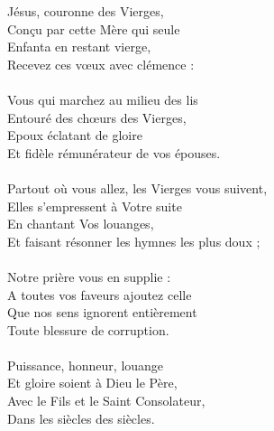 Jésus, couronne des Vierges,\\
Conçu par cette Mère qui seule\\
Enfanta en restant vierge,\\
Recevez ces vœux avec clémence :\\
\\
Vous qui marchez au milieu des lis\\
Entouré des chœurs des Vierges,\\
Epoux éclatant de gloire\\
Et fidèle rémunérateur de vos épouses.\\
\\
Partout où vous allez, les Vierges vous suivent,\\
Elles s'empressent à Votre suite\\
En chantant Vos louanges,\\
Et faisant résonner les hymnes les plus doux ;\\
\\
Notre prière vous en supplie :\\
A toutes vos faveurs ajoutez celle\\
Que nos sens ignorent entièrement\\
Toute blessure de corruption.\\
\\
Puissance, honneur, louange\\
Et gloire soient à Dieu le Père,\\
Avec le Fils et le Saint Consolateur,\\
Dans les siècles des siècles.